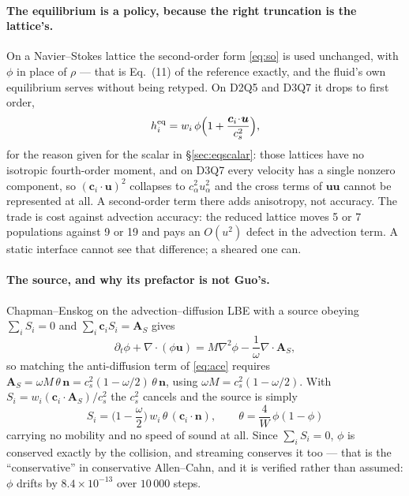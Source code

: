\documentclass[11pt,a4paper]{article}
\newcommand{\cs}{c_s}
\newcommand{\ci}{\bm{c}_i}
\newcommand{\uu}{\bm{u}}
\newcommand{\nn}{\bm{n}}
\newcommand{\e}[1]{\times 10^{#1}}
\begin{document}
\paragraph{The equilibrium is a policy, because the right truncation is the
lattice's.} On a Navier--Stokes lattice the second-order form \eqref{eq:so} is
used unchanged, with $\phi$ in place of $\rho$ --- that is Eq.~(11) of the
reference exactly, and the fluid's own equilibrium serves without being
retyped. On D2Q5 and D3Q7 it drops to first order,
\begin{equation}
  h_i^{\rm eq} = w_i\,\phi\Big(1+\frac{\ci\!\cdot\!\uu}{\cs^2}\Big),
\end{equation}
for the reason given for the scalar in \S\ref{sec:eqscalar}: those lattices have
no isotropic fourth-order moment, and on D3Q7 every velocity has a single
nonzero component, so $(\ci\!\cdot\!\uu)^2$ collapses to $c_\alpha^2u_\alpha^2$
and the cross terms of $\uu\uu$ cannot be represented at all. A second-order
term there adds anisotropy, not accuracy. The trade is cost against advection
accuracy: the reduced lattice moves 5 or 7 populations against 9 or 19 and pays
an $O(u^2)$ defect in the advection term. A static interface cannot see that
difference; a sheared one can.

\paragraph{The source, and why its prefactor is not Guo's.} Chapman--Enskog on
the advection--diffusion LBE with a source obeying $\sum_i S_i = 0$ and
$\sum_i \ci S_i = \bm{A}_S$ gives
\begin{equation}
  \partial_t\phi + \nabla\!\cdot(\phi\uu)
    = M\nabla^2\phi - \frac{1}{\omega}\nabla\!\cdot\bm{A}_S ,
\end{equation}
so matching the anti-diffusion term of \eqref{eq:ace} requires
$\bm{A}_S = \omega M\,\theta\,\nn = \cs^2(1-\omega/2)\,\theta\,\nn$, using
$\omega M = \cs^2(1-\omega/2)$. With $S_i = w_i(\ci\!\cdot\!\bm{A}_S)/\cs^2$ the
$\cs^2$ cancels and the source is simply
\begin{equation}
  \boxed{\;
  S_i = \Big(1-\frac{\omega}{2}\Big)\,w_i\,\theta\,(\ci\!\cdot\!\nn),
  \qquad \theta = \frac{4}{W}\,\phi(1-\phi) \;}
  \label{eq:acesource}
\end{equation}
carrying no mobility and no speed of sound at all. Since $\sum_i S_i = 0$, $\phi$
is conserved exactly by the collision, and streaming conserves it too --- that
is the ``conservative'' in conservative Allen--Cahn, and it is verified rather
than assumed: $\phi$ drifts by $8.4\e{-13}$ over $10\,000$ steps.
\end{document}
